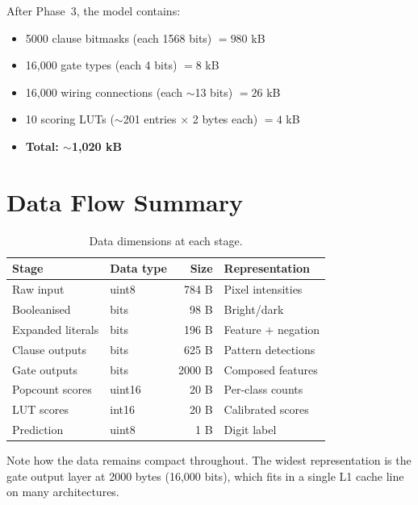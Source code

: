 After Phase~3, the model contains:
\begin{itemize}
  \item 5000 clause bitmasks (each 1568 bits) $= 980$ kB
  \item 16,000 gate types (each 4 bits) $= 8$ kB
  \item 16,000 wiring connections (each $\sim$13 bits) $= 26$ kB
  \item 10 scoring LUTs ($\sim$201 entries $\times$ 2 bytes each)
    $= 4$ kB
  \item \textbf{Total: $\sim$1,020 kB}
\end{itemize}


\section{Data Flow Summary}
\label{sec:data-flow}

\begin{table}[htbp]
\centering
\caption{Data dimensions at each stage.}
\label{tab:data-flow}
\begin{tabular}{@{}llrl@{}}
  \toprule
  \textbf{Stage} & \textbf{Data type} & \textbf{Size}
    & \textbf{Representation} \\
  \midrule
  Raw input & uint8 & 784 B & Pixel intensities \\
  Booleanised & bits & 98 B & Bright/dark \\
  Expanded literals & bits & 196 B & Feature $+$ negation \\
  Clause outputs & bits & 625 B & Pattern detections \\
  Gate outputs & bits & 2000 B & Composed features \\
  Popcount scores & uint16 & 20 B & Per-class counts \\
  LUT scores & int16 & 20 B & Calibrated scores \\
  Prediction & uint8 & 1 B & Digit label \\
  \bottomrule
\end{tabular}
\end{table}

Note how the data remains compact throughout. The widest
representation is the gate output layer at 2000 bytes (16,000 bits),
which fits in a single L1 cache line on many architectures.


